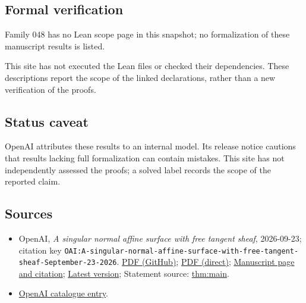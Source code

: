 \documentclass[11pt]{article}
\begin{document}
\subsection{Formal verification}
Family 048 has no Lean scope page in this snapshot; no formalization of these manuscript results is listed.

This site has not executed the Lean files or checked their dependencies. These descriptions report the scope of the linked declarations, rather than a new verification of the proofs.

\subsection{Status caveat}
OpenAI attributes these results to an internal model. Its release notice cautions that results lacking full formalization can contain mistakes. This site has not independently assessed the proofs; a solved label records the scope of the reported claim.

\subsection{Sources}
\begin{itemize}
\item OpenAI, \emph{A singular normal affine surface with free tangent sheaf}, 2026-09-23; citation key \texttt{OAI:A-singular-normal-affine-surface-with-free-tangent-sheaf-September-23-2026}. \href{https://github.com/openai/math/blob/adc7f1241b42e322a6451854ab7e4b4c146bf78a/preprints/A-singular-normal-affine-surface-with-free-tangent-sheaf-September-23-2026/paper.pdf}{PDF (GitHub)}; \href{https://github.com/openai/math/raw/adc7f1241b42e322a6451854ab7e4b4c146bf78a/preprints/A-singular-normal-affine-surface-with-free-tangent-sheaf-September-23-2026/paper.pdf}{PDF (direct)}; \href{https://github.com/openai/math/blob/adc7f1241b42e322a6451854ab7e4b4c146bf78a/preprints/A-singular-normal-affine-surface-with-free-tangent-sheaf-September-23-2026/README.md}{Manuscript page and citation}; \href{https://github.com/openai/math/blob/main/preprints/A-singular-normal-affine-surface-with-free-tangent-sheaf-September-23-2026/paper.pdf}{Latest version}; Statement source: \href{https://github.com/openai/math/blob/adc7f1241b42e322a6451854ab7e4b4c146bf78a/preprints/A-singular-normal-affine-surface-with-free-tangent-sheaf-September-23-2026/build/01-introduction.tex\#L20}{thm:main}.
\item \href{https://github.com/openai/math/blob/adc7f1241b42e322a6451854ab7e4b4c146bf78a/CONTENTS.md}{OpenAI catalogue entry}.
\end{itemize}
\end{document}
